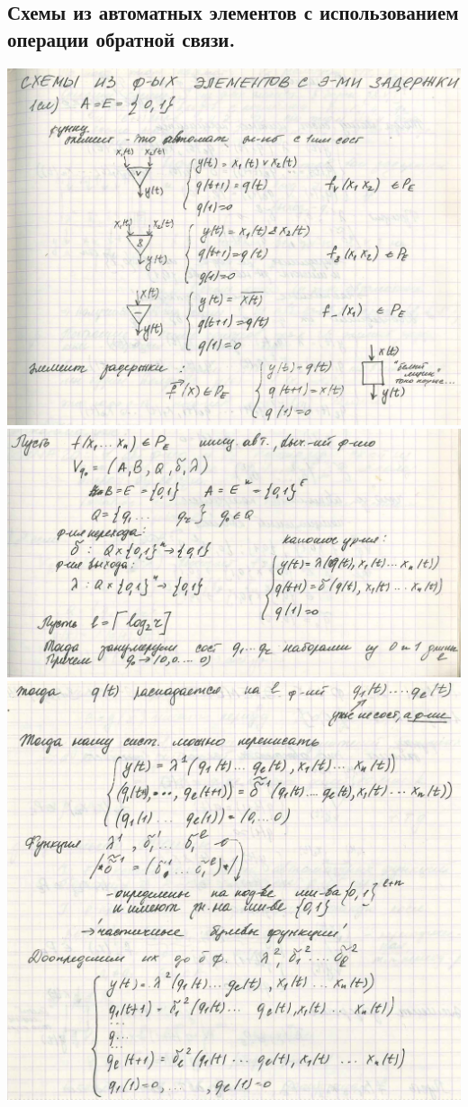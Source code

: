 \documentclass[12pt]{article}
\begin{document}
\subsection{Схемы из автоматных элементов с использованием операции обратной связи.}
	\includegraphics[width=450pt]{45}\\
	\includegraphics[width=450pt]{46}\\
	\includegraphics[width=450pt]{47}\\
\end{document}
